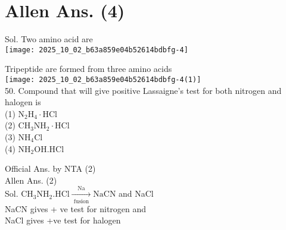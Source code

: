 \documentclass[10pt]{article}
\begin{document}
\section*{Allen Ans. (4)}
Sol. Two amino acid are\\
\texttt{[image: 2025\_10\_02\_b63a859e04b52614bdbfg-4]}

Tripeptide are formed from three amino acids\\
\texttt{[image: 2025\_10\_02\_b63a859e04b52614bdbfg-4(1)]}\\
50. Compound that will give positive Lassaigne's test for both nitrogen and halogen is\\
(1) \(\mathrm{N}_{2} \mathrm{H}_{4} \cdot \mathrm{HCl}\)\\
(2) \(\mathrm{CH}_{3} \mathrm{NH}_{2} \cdot \mathrm{HCl}\)\\
(3) \(\mathrm{NH}_{4} \mathrm{Cl}\)\\
(4) \(\mathrm{NH}_{2} \mathrm{OH} . \mathrm{HCl}\)

Official Ans. by NTA (2)\\
Allen Ans. (2)\\
Sol. \(\mathrm{CH}_{3} \mathrm{NH}_{2} . \mathrm{HCl} \xrightarrow[\text { fusion }]{\mathrm{Na}} \mathrm{NaCN}\) and NaCl\\
NaCN gives + ve test for nitrogen and\\
NaCl gives +ve test for halogen
\end{document}
